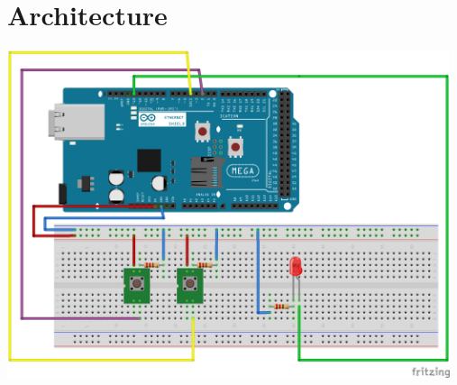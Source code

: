 \section{Architecture}

\begin{center}
    \includegraphics[width=13cm]{user_manual.includes/ard_architecture.png}
\end{center}
